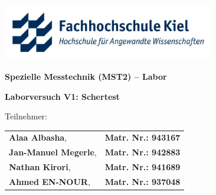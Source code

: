 \documentclass[12pt,a4paper,ngerman,captions=tableheading]{scrartcl}
\begin{document}

\begin{titlepage}
\centering
\begin{onehalfspace}
    \huge \textbf{}  
    \linebreak \large \textbf{}
\end{onehalfspace}


\includegraphics[height=70pt]{Bilder/fhkiel_logo.jpg}

\vspace{0.6cm}

\begin{onehalfspace}
    \huge \textbf{Spezielle Messtechnik (MST2) – Labor}  \linebreak \large \textbf{}
\end{onehalfspace}

\vspace{0.3cm}

\begin{onehalfspace}
    \Large \textbf{Laborversuch V1:  Schertest}
\end{onehalfspace}

\vspace{1cm}
{\large Teilnehmer:} 
    \vspace{0.5cm}

    \begin{tabular}{l l}
        \large\textbf{Alaa Albasha}, & \textbf{Matr. Nr.: 943167} \\
        \large\textbf{Jan-Manuel Megerle}, & \textbf{Matr. Nr.: 942883} \\
        \large\textbf{Nathan Kirori}, & \textbf{Matr. Nr.: 941689} \\
        \large\textbf{Ahmed EN-NOUR}, & \textbf{Matr. Nr.: 937048} \\
    \end{tabular}



\end{titlepage}
\end{document}
